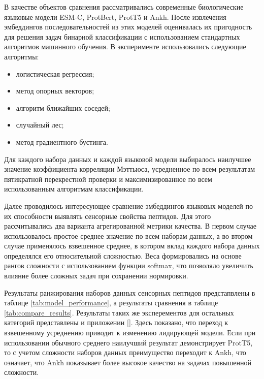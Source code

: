 \documentclass[specification,annotation,times]{itmo-student-thesis}
\begin{document}
В качестве объектов сравнения рассматривались современные биологические языковые модели ESM-C, ProtBert, ProtT5 и Ankh. 
После извлечения эмбеддингов последовательностей из этих моделей оценивалась их пригодность для решения задач бинарной классификации 
с использованием стандартных алгоритмов машинного обучения. 
В эксперименте использовались следующие алгоритмы:

\begin{itemize}
    \item логистическая регрессия;
    \item метод опорных векторов;
    \item алгоритм ближайших соседей;
    \item случайный лес;
    \item метод градиентного бустинга.
\end{itemize}

Для каждого набора данных и каждой языковой модели выбиралось наилучшее 
значение коэффициента корреляции Мэттьюса, усредненное по всем результатам 
пятикратной перекрестной проверки и максимизированное по всем использованным алгоритмам классификации. 

Далее проводилось интересующее сравнение эмбеддингов языковых моделей по их способности выявлять сенсорные свойства пептидов. 
Для этого рассчитывались два варианта агрегированной метрики качества. 
В первом случае использовалось простое среднее значение по всем наборам данных, 
а во втором случае применялось взвешенное среднее, 
в котором вклад каждого набора данных определялся его относительной сложностью. 
Веса формировались на основе рангов сложности с использованием функции softmax, 
что позволяло увеличить влияние более сложных задач при сохранении нормировки.

Результаты ранжирования наборов данных сенсорных пептидов предстапвлены в таблице \ref{tab:model_performance}, 
а результаты сравнения в таблице \ref{tab:compare_results}. 
Результаты таких же эксперементов для остальных категорий представлены и приложении \ref{}.
Здесь показано, что переход к взвешенному усреднению приводит к изменению лидирующей модели. 
Если при использовании обычного среднего наилучший результат демонстрирует ProtT5, 
то с учетом сложности наборов данных преимущество переходит к Ankh, 
что означает, что Ankh показывает более высокое качество на задачах повышенной сложности.
\end{document}
